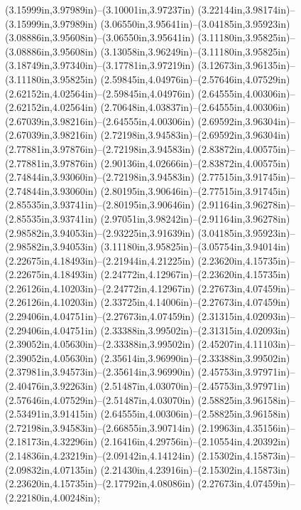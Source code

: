 (3.15999in,3.97989in)--(3.10001in,3.97237in) (3.22144in,3.98174in)--(3.15999in,3.97989in) (3.06550in,3.95641in)--(3.04185in,3.95923in) (3.08886in,3.95608in)--(3.06550in,3.95641in) (3.11180in,3.95825in)--(3.08886in,3.95608in) (3.13058in,3.96249in)--(3.11180in,3.95825in) (3.18749in,3.97340in)--(3.17781in,3.97219in) (3.12673in,3.96135in)--(3.11180in,3.95825in) (2.59845in,4.04976in)--(2.57646in,4.07529in) (2.62152in,4.02564in)--(2.59845in,4.04976in) (2.64555in,4.00306in)--(2.62152in,4.02564in) (2.70648in,4.03837in)--(2.64555in,4.00306in) (2.67039in,3.98216in)--(2.64555in,4.00306in) (2.69592in,3.96304in)--(2.67039in,3.98216in) (2.72198in,3.94583in)--(2.69592in,3.96304in) (2.77881in,3.97876in)--(2.72198in,3.94583in) (2.83872in,4.00575in)--(2.77881in,3.97876in) (2.90136in,4.02666in)--(2.83872in,4.00575in) (2.74844in,3.93060in)--(2.72198in,3.94583in) (2.77515in,3.91745in)--(2.74844in,3.93060in) (2.80195in,3.90646in)--(2.77515in,3.91745in) (2.85535in,3.93741in)--(2.80195in,3.90646in) (2.91164in,3.96278in)--(2.85535in,3.93741in) (2.97051in,3.98242in)--(2.91164in,3.96278in) (2.98582in,3.94053in)--(2.93225in,3.91639in) (3.04185in,3.95923in)--(2.98582in,3.94053in) (3.11180in,3.95825in)--(3.05754in,3.94014in) (2.22675in,4.18493in)--(2.21944in,4.21225in) (2.23620in,4.15735in)--(2.22675in,4.18493in) (2.24772in,4.12967in)--(2.23620in,4.15735in) (2.26126in,4.10203in)--(2.24772in,4.12967in) (2.27673in,4.07459in)--(2.26126in,4.10203in) (2.33725in,4.14006in)--(2.27673in,4.07459in) (2.29406in,4.04751in)--(2.27673in,4.07459in) (2.31315in,4.02093in)--(2.29406in,4.04751in) (2.33388in,3.99502in)--(2.31315in,4.02093in) (2.39052in,4.05630in)--(2.33388in,3.99502in) (2.45207in,4.11103in)--(2.39052in,4.05630in) (2.35614in,3.96990in)--(2.33388in,3.99502in) (2.37981in,3.94573in)--(2.35614in,3.96990in) (2.45753in,3.97971in)--(2.40476in,3.92263in) (2.51487in,4.03070in)--(2.45753in,3.97971in) (2.57646in,4.07529in)--(2.51487in,4.03070in) (2.58825in,3.96158in)--(2.53491in,3.91415in) (2.64555in,4.00306in)--(2.58825in,3.96158in) (2.72198in,3.94583in)--(2.66855in,3.90714in) (2.19963in,4.35156in)--(2.18173in,4.32296in) (2.16416in,4.29756in)--(2.10554in,4.20392in) (2.14836in,4.23219in)--(2.09142in,4.14124in) (2.15302in,4.15873in)--(2.09832in,4.07135in) (2.21430in,4.23916in)--(2.15302in,4.15873in) (2.23620in,4.15735in)--(2.17792in,4.08086in) (2.27673in,4.07459in)--(2.22180in,4.00248in);
